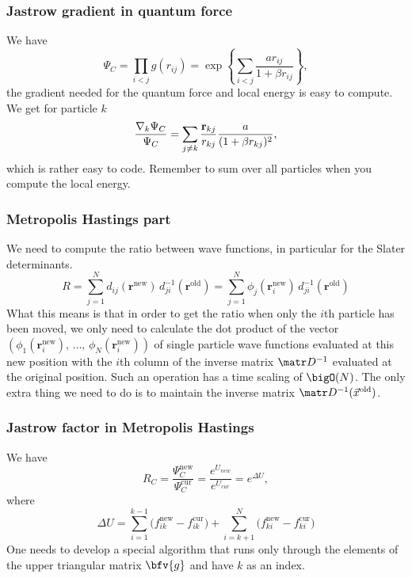 \frame
{
  \frametitle{Jastrow gradient in quantum force}
\begin{small}
{\scriptsize
We have
\[
\Psi_C=\prod_{i< j}g(r_{ij})= \exp{\left\{\sum_{i<j}\frac{ar_{ij}}{1+\beta r_{ij}}\right\}},
\]
the gradient needed for the quantum force and local energy is easy to compute.  
We get for particle  $k$
\[
\frac{ \nabla_k \Psi_C}{ \Psi_C }= \sum_{j\ne k}\frac{{\bf r}_{kj}}{r_{kj}}\frac{a}{(1+\beta r_{kj})^2},
\]
which is rather easy to code.  Remember to sum over all particles  when you compute the local energy.
}
\end{small}
}
\frame
{
  \frametitle{Metropolis Hastings part}
\begin{small}
{\scriptsize

We need to compute the ratio between wave functions, in particular  for the Slater determinants.
\[
R =
\sum_{j=1}^N d_{ij}(\mathbf{r}^{\mathrm{new}})\,
d_{ji}^{-1}(\mathbf{r}^{\mathrm{old}}) = 
\sum_{j=1}^N \phi_j(\mathbf{r}_i^{\mathrm{new}})\,
d_{ji}^{-1}(\mathbf{r}^{\mathrm{old}})
\]
What this means is that in order to get the ratio when only the $i$th
particle  has been moved, we only need to calculate the dot
product of the vector $\left(\phi_1(\mathbf{r}_i^\mathrm{new}),\,\dots,\,
\phi_N(\mathbf{r}_i^\mathrm{new})\right)$ of single particle  wave functions
evaluated at this new position with the $i$th column of the inverse
matrix $\matr D^{-1}$ evaluated at the original position. Such
an operation has a time scaling of $\bigO(N)$. The only extra thing we
need to do is to maintain the inverse matrix $\matr D^{-1}(\vec
x^{\mathrm{old}})$.
}
\end{small}
}



\frame
 {
   \frametitle{Jastrow factor in Metropolis Hastings}
 \begin{small}
 {\scriptsize
We have
\begin{equation}
 \boxed{R_{C} = \frac{\Psi_{C}^\mathrm{new}}{\Psi_{C}^\mathrm{cur}} = \frac{e^{U_{new}}}{e^{U_{cur}}} = e^{\Delta U},}
\end{equation}
where
\begin{equation}
\Delta U =
\sum_{i=1}^{k-1}\big(f_{ik}^\mathrm{new}-f_{ik}^\mathrm{cur}\big)
+
\sum_{i=k+1}^{N}\big(f_{ki}^\mathrm{new}-f_{ki}^\mathrm{cur}\big)
\end{equation}
One needs to develop a special algorithm 
that runs only through the elements of the upper triangular
matrix $\bfv{g}$ and have $k$ as an index. 

 }
 \end{small}
 }



